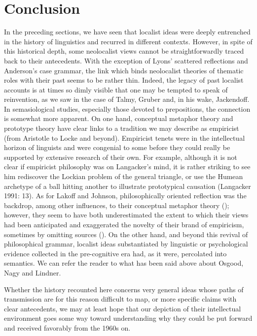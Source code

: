 \documentclass[output=paper]{langscibook}
\begin{document}
\section{Conclusion}

In the preceding sections, we have seen that localist ideas were deeply entrenched in the history of linguistics and recurred in different contexts. However, in spite of this historical depth, some neolocalist views cannot be straightforwardly traced back to their antecedents. With the exception of Lyons’ scattered reflections and Anderson’s case grammar, the link which binds neolocalist theories of thematic roles with their past seems to be rather thin. Indeed, the legacy of past localist accounts is at times so dimly visible that one may be tempted to speak of reinvention, as we saw in the case of Talmy, Gruber and, in his wake, Jackendoff. In semasiological studies, especially those devoted to prepositions, the connection is somewhat more apparent. On one hand, conceptual metaphor theory and prototype theory have clear links to a tradition we may describe as empiricist (from Aristotle to Locke and beyond). Empiricist tenets were in the intellectual horizon of linguists and were congenial to some before they could really be supported by extensive research of their own. For example, although it is not clear if empiricist philosophy was on Langacker’s mind, it is rather striking to see him rediscover the Lockian problem of the general triangle, or use the Humean archetype of a ball hitting another to illustrate prototypical causation (Langacker 1991: 13). As for Lakoff and Johnson, philosophically oriented reflection was the backdrop, among other influences, to their conceptual metaphor theory (\citealt{johnson_introduction:_1981}); however, they seem to have both underestimated the extent to which their views had been anticipated and exaggerated the novelty of their brand of empiricism, sometimes by omitting sources (\citealt{arigne_prototype_2018}). On the other hand, and beyond this revival of philosophical grammar, localist ideas substantiated by linguistic or psychological evidence collected in the pre-cognitive era had, as it were, percolated into semantics. We can refer the reader to what has been said above about Osgood, Nagy and Lindner. 

Whether the history recounted here concerns very general ideas whose paths of transmission are for this reason difficult to map, or more specific claims with clear antecedents, we may at least hope that our depiction of their intellectual environment goes some way toward understanding why they could be put forward and received favorably from the 1960s on. 


{\sloppy\printbibliography[heading=subbibliography,notkeyword=this]}
\end{document}
